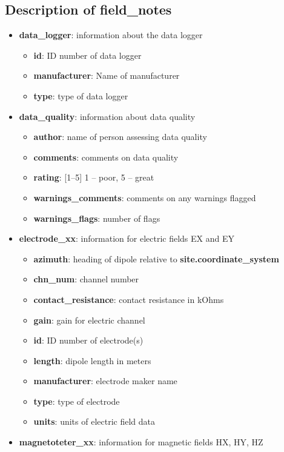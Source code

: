 \documentclass{article}
\newcommand{\attr}[1]{\textbf{#1}}
\begin{document}
\subsection{Description of \textbf{field\_notes}}
\begin{itemize}
	\setlength{\itemsep}{.05em}
	\item \attr{data\_logger}: information about the data logger
	\begin{itemize}
		\setlength{\itemsep}{.05em}
		\item \attr{id}: ID number of data logger
		\item \attr{manufacturer}: Name of manufacturer
		\item \attr{type}: type of data logger
	\end{itemize}
	\item \attr{data\_quality}: information about data quality
	\begin{itemize}
		\setlength{\itemsep}{.05em}
		\item \attr{author}: name of person assessing data quality
		\item \attr{comments}: comments on data quality
		\item \attr{rating}: [1--5] 1 -- poor, 5 -- great
		\item \attr{warnings\_comments}: comments on any warnings flagged
		\item \attr{warnings\_flags}: number of flags
	\end{itemize}
	\item \attr{electrode\_xx}: information for electric fields EX and EY
	\begin{itemize}
		\setlength{\itemsep}{.05em}
		\item \attr{azimuth}: heading of dipole relative to \attr{site.coordinate\_system}
		\item \attr{chn\_num}: channel number 
		\item \attr{contact\_resistance}: contact resistance in kOhms
		\item \attr{gain}: gain for electric channel
		\item \attr{id}: ID number of electrode(s)
		\item \attr{length}: dipole length in meters
		\item \attr{manufacturer}: electrode maker name
		\item \attr{type}: type of electrode
		\item \attr{units}: units of electric field data 
	\end{itemize}
	\item \attr{magnetoteter\_xx}: information for magnetic fields HX, HY, HZ

\end{itemize}
\end{document}
